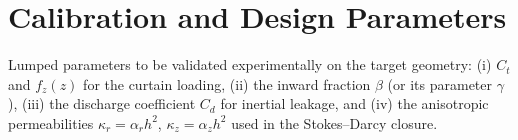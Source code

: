 \documentclass[11pt,a4paper]{article}
\begin{document}
\section{Calibration and Design Parameters}
Lumped parameters to be validated experimentally on the target geometry: (i) $C_t$ and $f_z(z)$ for the curtain loading, (ii) the inward fraction $\beta$ (or its parameter $\gamma$), (iii) the discharge coefficient $C_d$ for inertial leakage, and (iv) the anisotropic permeabilities $\kappa_r=\alpha_r h^2$, $\kappa_z=\alpha_z h^2$ used in the Stokes--Darcy closure.
\end{document}
